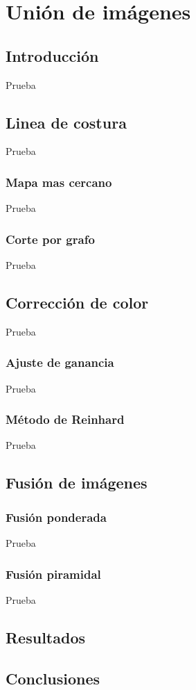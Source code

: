 \chapter{Unión de imágenes}
\label{capitulo5}


\section{Introducción}
Prueba

\section{Linea de costura}
Prueba

\subsection{Mapa mas cercano}
Prueba

\subsection{Corte por grafo}
Prueba

\section{Corrección de color}
Prueba

\subsection{Ajuste de ganancia}
Prueba

\subsection{Método de Reinhard}
Prueba

\section{Fusión de imágenes}

\subsection{Fusión ponderada}
Prueba
\subsection{Fusión piramidal}
Prueba

\section{Resultados}

\section{Conclusiones}



